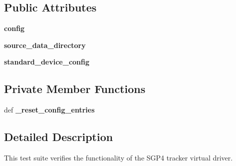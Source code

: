 \subsection*{Public Attributes}
\begin{DoxyCompactItemize}
\item 
\hypertarget{classhwm_1_1hardware_1_1devices_1_1drivers_1_1sgp4__tracker_1_1tests_1_1test__sgp4__tracker_1_1_test_s_g_p4_tracker_a6afe9ad8ff1c1d749b8e9f95ac1086f8}{{\bfseries config}}\label{classhwm_1_1hardware_1_1devices_1_1drivers_1_1sgp4__tracker_1_1tests_1_1test__sgp4__tracker_1_1_test_s_g_p4_tracker_a6afe9ad8ff1c1d749b8e9f95ac1086f8}

\item 
\hypertarget{classhwm_1_1hardware_1_1devices_1_1drivers_1_1sgp4__tracker_1_1tests_1_1test__sgp4__tracker_1_1_test_s_g_p4_tracker_a56980a90087c9b9f447ab3917faab7e9}{{\bfseries source\-\_\-data\-\_\-directory}}\label{classhwm_1_1hardware_1_1devices_1_1drivers_1_1sgp4__tracker_1_1tests_1_1test__sgp4__tracker_1_1_test_s_g_p4_tracker_a56980a90087c9b9f447ab3917faab7e9}

\item 
\hypertarget{classhwm_1_1hardware_1_1devices_1_1drivers_1_1sgp4__tracker_1_1tests_1_1test__sgp4__tracker_1_1_test_s_g_p4_tracker_afeb3b12497cfd7c7b49a6ff949c3a821}{{\bfseries standard\-\_\-device\-\_\-config}}\label{classhwm_1_1hardware_1_1devices_1_1drivers_1_1sgp4__tracker_1_1tests_1_1test__sgp4__tracker_1_1_test_s_g_p4_tracker_afeb3b12497cfd7c7b49a6ff949c3a821}

\end{DoxyCompactItemize}
\subsection*{Private Member Functions}
\begin{DoxyCompactItemize}
\item 
\hypertarget{classhwm_1_1hardware_1_1devices_1_1drivers_1_1sgp4__tracker_1_1tests_1_1test__sgp4__tracker_1_1_test_s_g_p4_tracker_a03c70c4a25fd0771ab0775dd033ca1b5}{def {\bfseries \-\_\-reset\-\_\-config\-\_\-entries}}\label{classhwm_1_1hardware_1_1devices_1_1drivers_1_1sgp4__tracker_1_1tests_1_1test__sgp4__tracker_1_1_test_s_g_p4_tracker_a03c70c4a25fd0771ab0775dd033ca1b5}

\end{DoxyCompactItemize}


\subsection{Detailed Description}
This test suite verifies the functionality of the S\-G\-P4 tracker virtual driver. 

